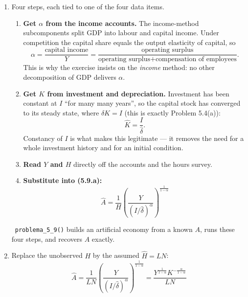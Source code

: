 \documentclass[12pt, letterpaper]{article}
\begin{document}
\begin{tcolorbox}[oddbox,title={Problem 5.9 \quad Disease and TFP}]
\begin{enumerate}
\smallskip
Note the exponent on $H$: it is exactly $-1$. Because $A$ is \emph{labour-augmenting}, it
multiplies $H$ one-for-one, so any proportional error in $H$ becomes the same proportional
error in $A$. In Problem 5.4 the corresponding elasticity, of measured productivity with
respect to the capital estimate, was only $-\alpha=-0.35$; here it is $-1$. That gap is the
point of the whole problem.

\item Four steps, each tied to one of the four data items.

\begin{enumerate}[label=\textbf{Step \arabic*.},leftmargin=2.6em,itemsep=4pt,topsep=3pt]
\item \textbf{Get $\alpha$ from the income accounts.} The income-method subcomponents split
GDP into labour and capital income. Under competition the capital share equals the output
elasticity of capital, so
\[
\alpha=\frac{\text{capital income}}{Y}
=\frac{\text{operating surplus}}
       {\text{operating surplus}+\text{compensation of employees}} .
\]
This is why the exercise insists on the \emph{income} method: no other decomposition of GDP
delivers $\alpha$.

\item \textbf{Get $K$ from investment and depreciation.} Investment has been constant at $I$
``for many many years'', so the capital stock has converged to its steady state, where
$\delta K=I$ (this is exactly Problem 5.4(a)):
\[
\hat K=\frac{I}{\hat\delta} .
\]
Constancy of $I$ is what makes this legitimate --- it removes the need for a whole
investment history and for an initial condition.

\item \textbf{Read $Y$ and $H$} directly off the accounts and the hours survey.

\item \textbf{Substitute into (5.9.a):}
\[
\boxed{\;\hat A=\frac{1}{H}\left(\frac{Y}{(I/\hat\delta)^{\alpha}}\right)^{\frac{1}{1-\alpha}}\;}
\]
\end{enumerate}
\checkmark\ \texttt{problema\_5\_9()} builds an artificial economy from a known $A$, runs
these four steps, and recovers $A$ exactly.

\item Replace the unobserved $H$ by the assumed $\hat H=LN$:
\[
\boxed{\;\hat A=\frac{1}{LN}\left(\frac{Y}{(I/\hat\delta)^{\alpha}}\right)^{\frac{1}{1-\alpha}}
=\frac{Y^{\frac{1}{1-\alpha}}K^{-\frac{\alpha}{1-\alpha}}}{LN}\;}
\]


\end{enumerate}
\end{tcolorbox}
\end{document}
